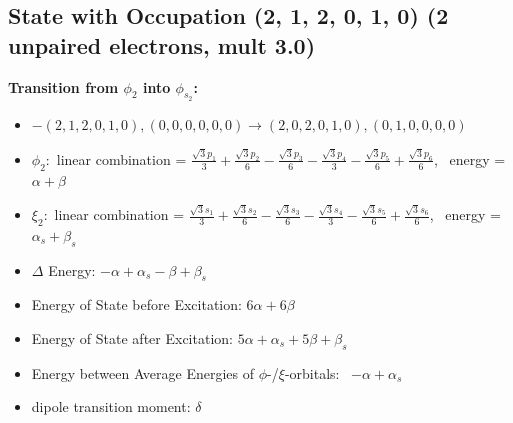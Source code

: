 \documentclass[12pt,a4paper]{article}
\begin{document}
\subsection*{State with Occupation (2, 1, 2, 0, 1, 0) (2 unpaired electrons, mult 3.0)}
        \noindent\textbf{Transition from $\phi_{2}$ into $\phi_{s_{2}}$:}
        \begin{itemize}
            \item $- (2, 1, 2, 0, 1, 0), (0, 0, 0, 0, 0, 0) \rightarrow (2, 0, 2, 0, 1, 0), (0, 1, 0, 0, 0, 0)$
        
            \item $\phi_{2}:$ linear combination = $\frac{\sqrt{3} p_{1}}{3} + \frac{\sqrt{3} p_{2}}{6} - \frac{\sqrt{3} p_{3}}{6} - \frac{\sqrt{3} p_{4}}{3} - \frac{\sqrt{3} p_{5}}{6} + \frac{\sqrt{3} p_{6}}{6}$, \
            energy = $\alpha + \beta$
            
            \item $\xi_{2}:$ linear combination = $\frac{\sqrt{3} s_{1}}{3} + \frac{\sqrt{3} s_{2}}{6} - \frac{\sqrt{3} s_{3}}{6} - \frac{\sqrt{3} s_{4}}{3} - \frac{\sqrt{3} s_{5}}{6} + \frac{\sqrt{3} s_{6}}{6}$, \
            energy = $\alpha_{s} + \beta_{s}$
            
            \item $\Delta$ Energy: $- \alpha + \alpha_{s} - \beta + \beta_{s}$
            \item Energy of State before Excitation: $6 \alpha + 6 \beta$
            \item Energy of State after Excitation: $5 \alpha + \alpha_{s} + 5 \beta + \beta_{s}$
            \item Energy between Average Energies of $\phi$-/$\xi$-orbitals: \
            $- \alpha + \alpha_{s}$
        
            \item dipole transition moment: $\delta$
        
        \end{itemize}
        
\end{document}
